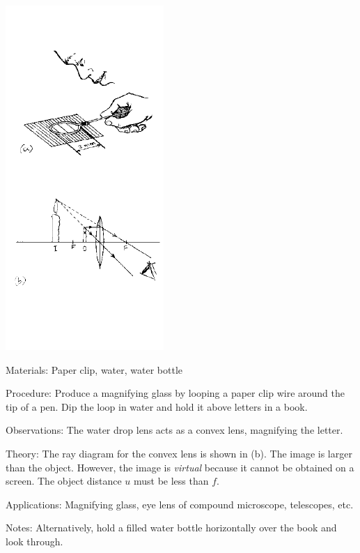 \begin{multicols}{2}
\begin{center}
\includegraphics[width=0.45\textwidth]{./img/source/magnification-convex.png}
\end{center}

\begin{description*}
\item[Materials:]{Paper clip, water, water bottle}
\item[Procedure:]{Produce a magnifying glass by looping a paper clip wire around the tip of a pen. Dip the loop in water and hold it above letters in a book.}
\item[Observations:]{The water drop lens acts as a convex lens, magnifying the letter.}
\item[Theory:]{The ray diagram for the convex lens is shown in (b). The image is larger than the object. However, the image is \emph{virtual} because it cannot be obtained on a screen. The object distance $u$ must be less than $f$.}
\item[Applications:]{Magnifying glass, eye lens of compound microscope, telescopes, etc.}
\item[Notes:]{Alternatively, hold a filled water bottle horizontally over the book and look through.}
\end{description*}


\end{multicols}
